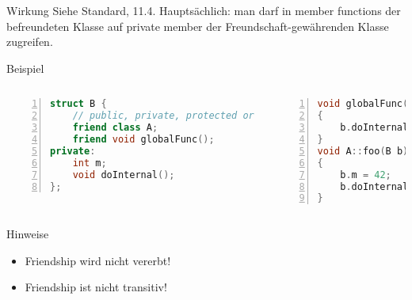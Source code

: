 \begin{frame}[fragile]{Wirkung}
	Siehe Standard, 11.4.
	Hauptsächlich: man darf in member functions der befreundeten Klasse auf private member der Freundschaft-gewährenden Klasse zugreifen.
	
	\begin{block}{Beispiel}
		\begin{columns}[t]
			\begin{lstlisting}[language=C++, basicstyle=\footnotesize, numbers=left, numberstyle=\tiny\color{gray}, tabsize=6, xleftmargin=2em]
struct B {
	// public, private, protected or nothing at all
	friend class A;
	friend void globalFunc();
private:
	int m;
	void doInternal();
};
			\end{lstlisting}
			
			\begin{lstlisting}[language=C++, basicstyle=\footnotesize, numbers=left, numberstyle=\tiny\color{gray}, tabsize=6, xleftmargin=2em]
void globalFunc(B b)
{
	b.doInternal();
}
void A::foo(B b)
{
	b.m = 42;
	b.doInternal();
}
			\end{lstlisting}
		\end{columns}
	\end{block}
\end{frame}

\begin{frame}{Hinweise}
	\begin{itemize}[<+->]
		\item Friendship wird nicht vererbt!
		\item Friendship ist nicht transitiv!
	\end{itemize}
\end{frame}
